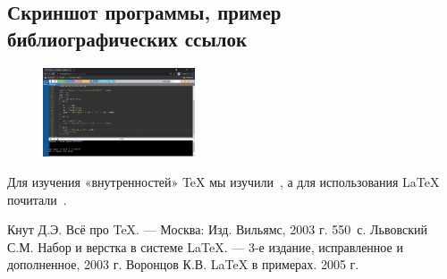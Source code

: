 \documentclass[12pt,a4paper]{scrartcl}
\begin{document}
\subsection{Скриншот программы, пример библиографических ссылок}
\label{sec:picexample}

\begin{figure}[h]
	\centering
	\includegraphics[width=0.4\textwidth]{ScreenOfProgramm.PNG}
\end{figure}

Для изучения «внутренностей» \TeX{} мы 
изучили~\cite{Knuth-2003}, а для использования \LaTeX{}
почитали~\cite{Lvovsky-2003, Voroncov-2005}.


\begin{thebibliography}{9}
Кнут Д.Э. Всё про \TeX. \newblock --- Москва: Изд. Вильямс, 2003 г. 550~с.
Львовский С.М. Набор и верстка в системе \LaTeX{}. \newblock --- 3-е издание, исправленное и дополненное, 2003 г.
Воронцов К.В. \LaTeX{} в примерах. 2005 г.
\end{thebibliography}
\end{document}
